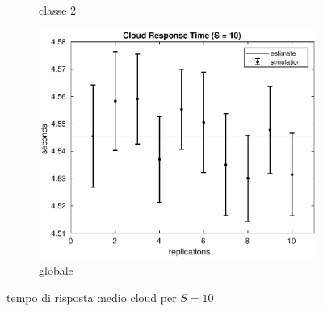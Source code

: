\begin{figure}[!h]
\begin{subfigure}[t]{0.49\textwidth}
\caption{classe 2}
\label{10_s2cloud}
\end{subfigure}
%
\begin{subfigure}[t]{0.5\textwidth}
\includegraphics[width=\textwidth]{figures/simul/10_500K_scloud}
\caption{globale}
\label{10_scloud}
\end{subfigure}
%
\caption{tempo di risposta medio cloud per $S = 10$}
\end{figure}
%

